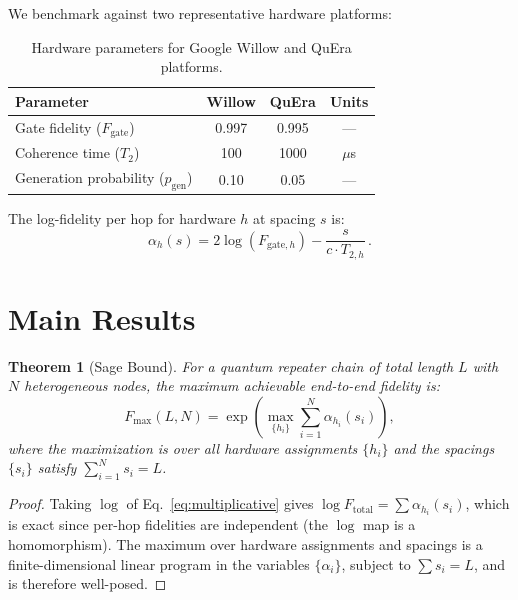 \documentclass[aps,pra,reprint,amsmath,amssymb,superscriptaddress]{revtex4-2}
\newtheorem{theorem}{Theorem}
\begin{document}
We benchmark against two representative hardware platforms:

\begin{table}[h]
\caption{Hardware parameters for Google Willow and QuEra platforms.}
\label{tab:hardware}
\begin{ruledtabular}
\begin{tabular}{lccc}
Parameter & Willow & QuEra & Units \\
\hline
Gate fidelity ($F_{\text{gate}}$) & 0.997 & 0.995 & --- \\
Coherence time ($T_2$) & 100 & 1000 & $\mu$s \\
Generation probability ($p_{\text{gen}}$) & 0.10 & 0.05 & --- \\
\end{tabular}
\end{ruledtabular}
\end{table}

The log-fidelity per hop for hardware $h$ at spacing $s$ is:
\begin{equation}
\alpha_h(s) = 2\log(F_{\text{gate},h}) - \frac{s}{c \cdot T_{2,h}} \,.
\label{eq:alpha}
\end{equation}


\section{Main Results}

\begin{theorem}[Sage Bound]
\label{thm:sage}
For a quantum repeater chain of total length $L$ with $N$ heterogeneous nodes, the maximum achievable end-to-end fidelity is:
\begin{equation}
F_{\max}(L, N) = \exp\!\left(\max_{\{h_i\}} \sum_{i=1}^{N} \alpha_{h_i}(s_i)\right) ,
\end{equation}
where the maximization is over all hardware assignments $\{h_i\}$ and the spacings $\{s_i\}$ satisfy $\sum_{i=1}^{N} s_i = L$.
\end{theorem}

\begin{proof}
Taking $\log$ of Eq.~\eqref{eq:multiplicative} gives $\log F_{\text{total}} = \sum \alpha_{h_i}(s_i)$, which is exact since per-hop fidelities are independent (the $\log$ map is a homomorphism). The maximum over hardware assignments and spacings is a finite-dimensional linear program in the variables $\{\alpha_i\}$, subject to $\sum s_i = L$, and is therefore well-posed.
\end{proof}
\end{document}
